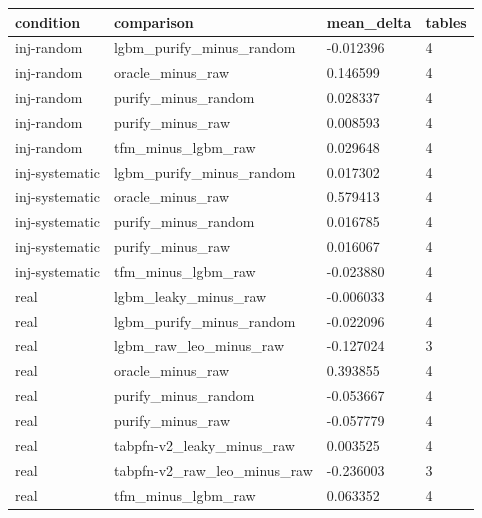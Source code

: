\begin{tabular}{llll}
\hline
condition & comparison & mean\_delta & tables \\
\hline
inj-random & lgbm\_purify\_minus\_random & -0.012396 & 4 \\
inj-random & oracle\_minus\_raw & 0.146599 & 4 \\
inj-random & purify\_minus\_random & 0.028337 & 4 \\
inj-random & purify\_minus\_raw & 0.008593 & 4 \\
inj-random & tfm\_minus\_lgbm\_raw & 0.029648 & 4 \\
inj-systematic & lgbm\_purify\_minus\_random & 0.017302 & 4 \\
inj-systematic & oracle\_minus\_raw & 0.579413 & 4 \\
inj-systematic & purify\_minus\_random & 0.016785 & 4 \\
inj-systematic & purify\_minus\_raw & 0.016067 & 4 \\
inj-systematic & tfm\_minus\_lgbm\_raw & -0.023880 & 4 \\
real & lgbm\_leaky\_minus\_raw & -0.006033 & 4 \\
real & lgbm\_purify\_minus\_random & -0.022096 & 4 \\
real & lgbm\_raw\_leo\_minus\_raw & -0.127024 & 3 \\
real & oracle\_minus\_raw & 0.393855 & 4 \\
real & purify\_minus\_random & -0.053667 & 4 \\
real & purify\_minus\_raw & -0.057779 & 4 \\
real & tabpfn-v2\_leaky\_minus\_raw & 0.003525 & 4 \\
real & tabpfn-v2\_raw\_leo\_minus\_raw & -0.236003 & 3 \\
real & tfm\_minus\_lgbm\_raw & 0.063352 & 4 \\
\hline
\end{tabular}
